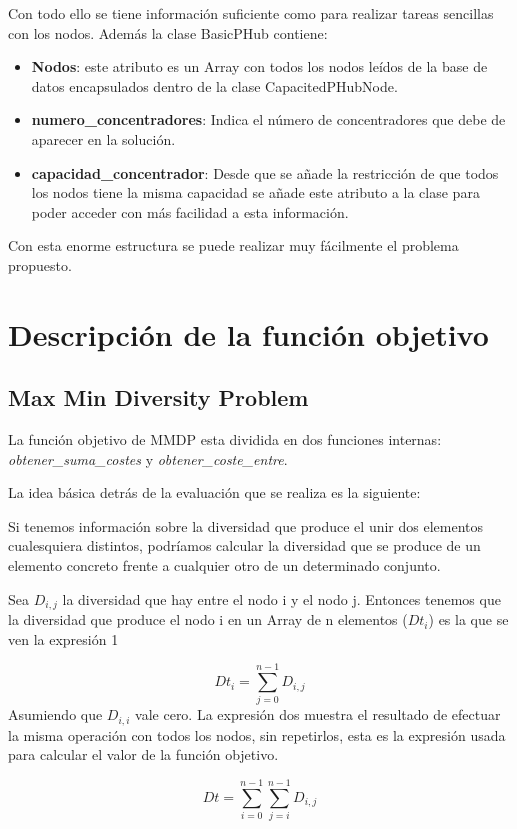 \documentclass[12pt,a4paper,draft,openany]{article}
\begin{document}
Con todo ello se tiene información suficiente como para realizar tareas sencillas con los nodos. Además la clase BasicPHub contiene:

\begin{itemize}
\item \textbf{Nodos}: este atributo es un Array con todos los nodos leídos de la base de datos encapsulados dentro de la clase CapacitedPHubNode.
\item \textbf{numero\_concentradores}: Indica el número de concentradores que debe de aparecer en la solución.
\item \textbf{capacidad\_concentrador}: Desde que se añade la restricción de que todos los nodos tiene la misma capacidad se añade este atributo a la clase para poder acceder con más facilidad a esta información.
\end{itemize}

Con esta enorme estructura se puede realizar muy fácilmente el problema propuesto.
\section{Descripción de la función objetivo}
\subsection{Max Min Diversity Problem}
La función objetivo de MMDP esta dividida en dos funciones internas: \emph{obtener\_suma\_costes} y \emph{obtener\_coste\_entre}.

La idea básica detrás de la evaluación que se realiza es la siguiente:

Si tenemos información sobre la diversidad que produce el unir dos elementos cualesquiera distintos, podríamos calcular la diversidad que se produce de un elemento concreto frente a cualquier otro de un determinado conjunto.

Sea $D_{i,j}$ la diversidad que hay entre el nodo i y el nodo j. Entonces tenemos que la diversidad que produce el nodo i en un Array de n elementos ($Dt_i$) es la que se ven la expresión 1

\begin{equation}
Dt_i = \sum_{j = 0}^{n-1} D_{i,j}
\end{equation}
Asumiendo que $D_{i,i}$ vale cero. La expresión dos muestra el resultado de efectuar la misma operación con todos los nodos, sin repetirlos, esta es la expresión usada para calcular el valor de la función objetivo.

\begin{equation}
Dt = \sum_{i = 0}^{n - 1}\sum_{j=i}^{n - 1} D_{i,j}
\end{equation}
\end{document}
